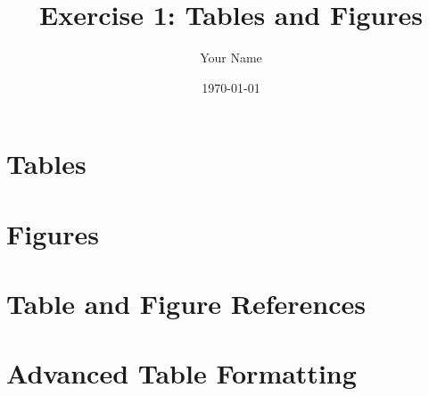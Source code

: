 \documentclass{article}
\title{Exercise 1: Tables and Figures}
\author{Your Name}
\date{\today}
\begin{document}
\maketitle

\section{Tables}


\section{Figures}

\section{Table and Figure References}

\section{Advanced Table Formatting}
\end{document}
